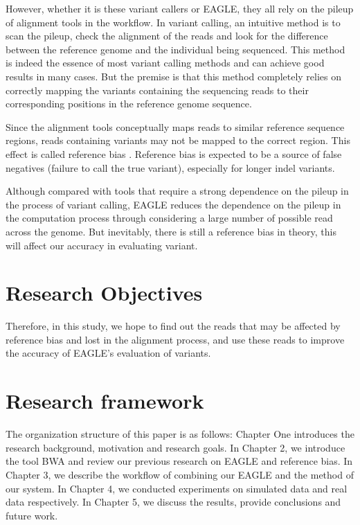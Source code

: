 However, whether it is these variant callers or EAGLE, they all rely on the pileup of alignment tools in the workflow. In variant calling, an intuitive method is to scan the pileup, check the alignment of the reads and look for the difference between the reference genome and the individual being sequenced. This method is indeed the essence of most variant calling methods and can achieve good results in many cases. But the premise is that this method completely relies on correctly mapping the variants containing the sequencing reads to their corresponding positions in the reference genome sequence. 

Since the alignment tools conceptually maps reads to similar reference sequence regions, reads containing variants may not be mapped to the correct region. This effect is called reference bias \cite{sousa2013understanding}. Reference bias is expected to be a source of false negatives (failure to call the true variant), especially for longer indel variants.

Although compared with tools that require a strong dependence on the pileup in the process of variant calling, EAGLE reduces the dependence on the pileup in the computation process through considering a large number of possible read across the genome. But inevitably, there is still a reference bias in theory, this will affect our accuracy in evaluating variant.

\section{Research Objectives}		
Therefore, in this study, we hope to find out the reads that may be affected by reference bias and lost in the alignment process, and use these reads to improve the accuracy of EAGLE's evaluation of variants.

\section{Research framework}
The organization structure of this paper is as follows: Chapter One introduces the research background, motivation and research goals. In Chapter 2, we introduce the tool BWA and review our previous research on EAGLE and reference bias. In Chapter 3, we describe the workflow of combining our EAGLE and the method of our system. In Chapter 4, we conducted experiments on simulated data and real data respectively. In Chapter 5, we discuss the results, provide conclusions and future work.
